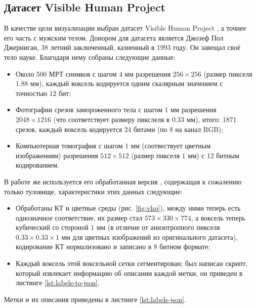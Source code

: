 \subsection{Датасет Visible Human Project}

В качестве цели визуализации выбран датасет Visible Human Project \cite{ackerman1999visible}, а точнее его часть с мужским телом. Донором для датасета является Джозеф Пол Джерниган, 38 летний заключенный, казненный в 1993 году. Он завещал своё тело науке. Благодаря нему собраны следующие данные:
\begin{itemize}
	\item Около 500 МРТ снимков с шагом $4$ мм разрешения $256\times256$ (размер пикселя $1.88$ мм), каждый воксель кодируется одним скалярным значением с точностью $12$ бит;
	\item Фотографии срезов замороженного тела с шагом $1$ мм разрешения $2048\times1216$ (что соответствует размеру пикслеля в $0.33$ мм), итого: 1871 срезов, каждый воксель кодируется 24 битами (по 8 на канал RGB);
	\item Компьютерная томография с шагом $1$ мм (соотвествует цветным изображениям) разрешения $512\times512$ (размер пикселя $1$ мм) с 12 битным кодированием.
\end{itemize}

В работе же используется его обработанная версия \cite{segmented_vhp}, содержащая к сожалению только туловище, характеристики этих данных следующие:
\begin{itemize}
	\item Обработаны КТ и цветные среды (рис. \ref{fig:vhp}), между ними теперь есть однозначное соответствие, их размер стал $573\times330\times774$, а воксель теперь кубический со стороной $1$ мм (в отличие от анизотропного пикселя $0.33\times0.33\times1$ мм для цветных изображений из оригинального датасета), кодирование КТ нормализовано и записано в $8$ битном формате;
	\item Каждый воксель этой воксельной сетки сегментирован; был написан скрипт, который извлекает информацию об описании каждой метки, он приведен в листинге \ref{lst:labels-to-json}.
\end{itemize}

Метки и их описания приведены в листинге \ref{lst:labels-json}.

